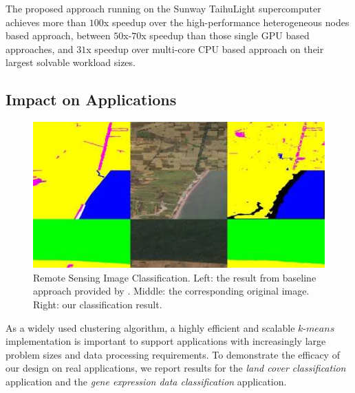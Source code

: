 \documentclass[10pt,journal,compsoc]{IEEEtran}
\begin{document}
{The proposed approach running on the Sunway TaihuLight supercomputer achieves more than $100$x speedup over the high-performance heterogeneous nodes based approach, between $50$x-$70$x speedup than those single GPU based approaches, and $31$x speedup over multi-core CPU based approach on their largest solvable workload sizes. 




\subsection{Impact on Applications}\label{applications}

\begin{figure}
\centering
\includegraphics[scale=0.40]{lc1.jpg}
\caption{Remote Sensing Image Classification. Left: the result from baseline approach provided by \cite{demir2018deepglobe}. Middle: the corresponding original image. Right: our classification result. 
}
\label{lc}
\end{figure}

As a widely used clustering algorithm, a highly efficient and scalable $k$-$means$ implementation is important to support applications with increasingly large problem sizes and data processing requirements. 
To demonstrate the efficacy of our design on real applications, we report results for the \textit{land cover classification} application and the \textit{gene expression data classification} application. 

}
\end{document}
